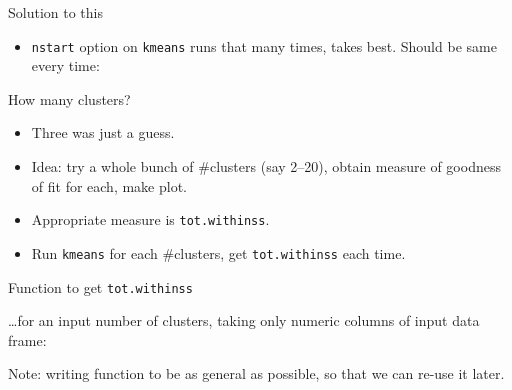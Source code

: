 \documentclass[ignorenonframetext,]{beamer}
\newenvironment{Shaded}{\begin{snugshade}}{\end{snugshade}}
\newcommand{\ControlFlowTok}[1]{\textcolor[rgb]{0.13,0.29,0.53}{\textbf{#1}}}
\newcommand{\DataTypeTok}[1]{\textcolor[rgb]{0.13,0.29,0.53}{#1}}
\newcommand{\DecValTok}[1]{\textcolor[rgb]{0.00,0.00,0.81}{#1}}
\newcommand{\KeywordTok}[1]{\textcolor[rgb]{0.13,0.29,0.53}{\textbf{#1}}}
\newcommand{\NormalTok}[1]{#1}
\newcommand{\OperatorTok}[1]{\textcolor[rgb]{0.81,0.36,0.00}{\textbf{#1}}}
\newcommand{\StringTok}[1]{\textcolor[rgb]{0.31,0.60,0.02}{#1}}
\providecommand{\tightlist}{%
  \setlength{\itemsep}{0pt}\setlength{\parskip}{0pt}}
\begin{document}
\begin{frame}[fragile]{Solution to this}
\protect\hypertarget{solution-to-this}{}

\begin{itemize}
\tightlist
\item
  \texttt{nstart} option on \texttt{kmeans} runs that many times, takes
  best. Should be same every time:
\end{itemize}

\small

\begin{Shaded}
\end{Shaded}

\normalsize

\end{frame}

\begin{frame}[fragile]{How many clusters?}
\protect\hypertarget{how-many-clusters}{}

\begin{itemize}
\item
  Three was just a guess.
\item
  Idea: try a whole bunch of \#clusters (say 2--20), obtain measure of
  goodness of fit for each, make plot.
\item
  Appropriate measure is \texttt{tot.withinss}.
\item
  Run \texttt{kmeans} for each \#clusters, get \texttt{tot.withinss}
  each time.
\end{itemize}

\end{frame}

\begin{frame}[fragile]{Function to get \texttt{tot.withinss}}
\protect\hypertarget{function-to-get-tot.withinss}{}

\ldots for an input number of clusters, taking only numeric columns of
input data frame:

\begin{Shaded}
\end{Shaded}

Note: writing function to be as general as possible, so that we can
re-use it later.

\end{frame}
\end{document}
